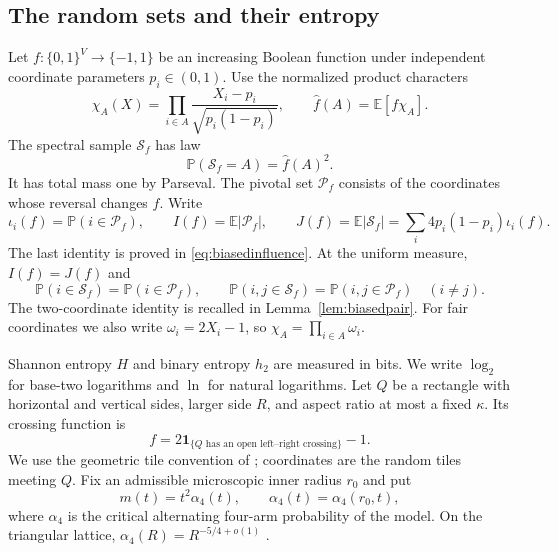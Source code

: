 \documentclass[11pt]{amsart}
\theoremstyle{remark}
\newcommand{\Prob}{\mathbb P}
\newcommand{\E}{\mathbb E}
\newcommand{\one}{\mathbf 1}
\newcommand{\cS}{\mathcal S}
\newcommand{\cP}{\mathcal P}
\begin{document}
\subsection{The random sets and their entropy}

Let $f:\{0,1\}^V\to\{-1,1\}$ be an increasing Boolean function under independent coordinate parameters $p_i\in(0,1)$. Use the normalized product characters
\[
 \chi_A(X)=\prod_{i\in A}\frac{X_i-p_i}{\sqrt{p_i(1-p_i)}},
 \qquad \widehat f(A)=\E[f\chi_A].
\]
The spectral sample $\cS_f$ has law
\begin{equation}\label{eq:spectral}
 \Prob(\cS_f=A)=\widehat f(A)^2.
\end{equation}
It has total mass one by Parseval. The pivotal set $\cP_f$ consists of the coordinates whose reversal changes $f$. Write
\[
 \iota_i(f)=\Prob(i\in\cP_f),\qquad
 I(f)=\E|\cP_f|,\qquad
 J(f)=\E|\cS_f|=\sum_i4p_i(1-p_i)\iota_i(f).
\]
The last identity is proved in \eqref{eq:biasedinfluence}. At the uniform measure, $I(f)=J(f)$ and
\begin{equation}\label{eq:jointmarginals}
 \Prob(i\in\cS_f)=\Prob(i\in\cP_f),\qquad
 \Prob(i,j\in\cS_f)=\Prob(i,j\in\cP_f)\quad(i\ne j).
\end{equation}
The two-coordinate identity is recalled in Lemma~\ref{lem:biasedpair}. For fair coordinates we also write $\omega_i=2X_i-1$, so $\chi_A=\prod_{i\in A}\omega_i$.

Shannon entropy $H$ and binary entropy $h_2$ are measured in bits. We write $\log_2$ for base-two logarithms and $\ln$ for natural logarithms. Let $Q$ be a rectangle with horizontal and vertical sides, larger side $R$, and aspect ratio at most a fixed $\kappa$. Its crossing function is
\[
 f=2\one_{\{Q\text{ has an open left--right crossing}\}}-1.
\]
We use the geometric tile convention of \cite[Section~2.1]{GPS}; coordinates are the random tiles meeting $Q$. Fix an admissible microscopic inner radius $r_0$ and put
\[
 m(t)=t^2\alpha_4(t),\qquad \alpha_4(t)=\alpha_4(r_0,t),
\]
where $\alpha_4$ is the critical alternating four-arm probability of the model. On the triangular lattice, $\alpha_4(R)=R^{-5/4+o(1)}$ \cite{SW}.
\end{document}
